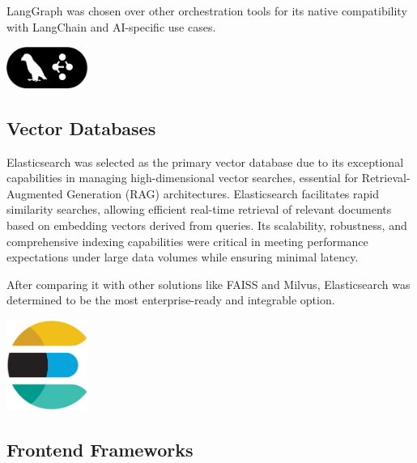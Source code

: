 LangGraph was chosen over other orchestration tools for its native compatibility with LangChain and AI-specific use cases.

\begin{center}
    \centering
    \includegraphics[width=0.2\textwidth]{Images/LangGraph Logo.png}
     \cite{langgraph_logo}
    \label{fig:langgraph_logo}
\end{center}

\subsection{Vector Databases}
Elasticsearch was selected as the primary vector database due to its exceptional capabilities in managing high-dimensional vector searches, essential for Retrieval-Augmented Generation (RAG) architectures. Elasticsearch facilitates rapid similarity searches, allowing efficient real-time retrieval of relevant documents based on embedding vectors derived from queries. Its scalability, robustness, and comprehensive indexing capabilities were critical in meeting performance expectations under large data volumes while ensuring minimal latency.\mynewline

After comparing it with other solutions like FAISS and Milvus, Elasticsearch was determined to be the most enterprise-ready and integrable option.

\begin{center}
    \centering
    \includegraphics[width=0.2\textwidth]{Images/Elasticsearch Logo.jpg}
     \cite{elasticsearch_logo}
    \label{fig:elasticsearch_logo}
\end{center}

\subsection{Frontend Frameworks}

